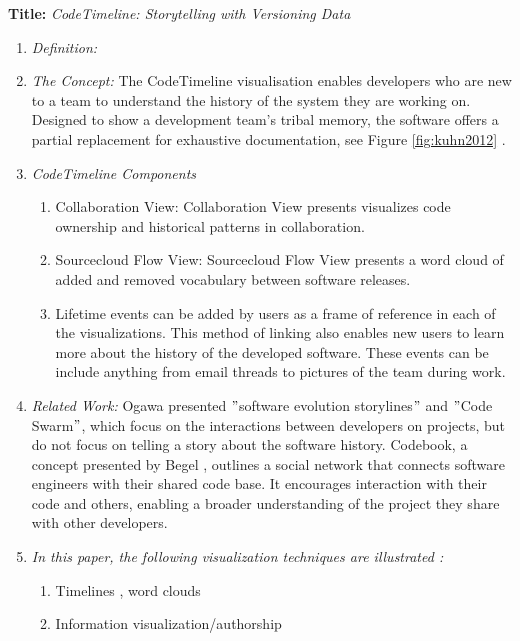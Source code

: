 \documentclass{egpubl}
\begin{document}
\textbf{Title:} \textit{CodeTimeline: Storytelling with Versioning Data}
\begin{enumerate}
\item \textit{Definition:} 
\item \textit{The Concept:} The CodeTimeline visualisation enables developers who are new to a team to understand the history of the system they are working on.  Designed to show a development team's tribal memory, the software offers a partial replacement for exhaustive documentation, see Figure \ref{fig:kuhn2012} \cite{kuhn2012}.
\item \textit{CodeTimeline Components}
\begin{enumerate}
\item Collaboration View: Collaboration View presents visualizes code ownership and historical patterns in collaboration. 

\item Sourcecloud Flow View: Sourcecloud Flow View presents a word cloud of added and removed vocabulary between software releases. 

\item Lifetime events can be added by users as a frame of reference in each of the visualizations. This method of linking also enables new users to learn more about the history of the developed software. These events can be include anything from email threads to pictures of the team during work.

\end{enumerate}

\item \textit{Related Work:} Ogawa \cite{Ogawa,ogawa2009} presented $"$software evolution storylines$"$ and $"$Code Swarm$"$, which focus on the interactions between developers on projects, but do not focus on telling a story about the software history. Codebook, a concept presented by Begel \cite{begel2010}, outlines a social network that connects software engineers with their shared code base. It encourages interaction with their code and others, enabling a broader understanding of the project they share with other developers.
\item \textit{In this paper, the following visualization techniques are illustrated :} 
\begin{enumerate}
\item Timelines , word clouds
\item Information visualization/authorship
\end{enumerate}
\end{enumerate}
\end{document}
